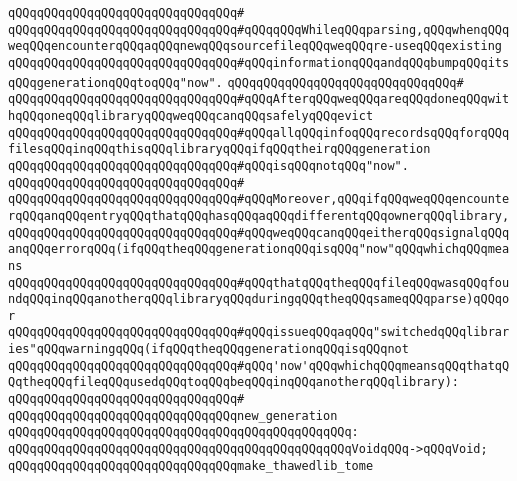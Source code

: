 \verb|qQQqqQQqqQQqqQQqqQQqqQQqqQQqqQQq#|\newline
\verb|qQQqqQQqqQQqqQQqqQQqqQQqqQQqqQQq#qQQqqQQqWhileqQQqparsing,qQQqwhenqQQqweqQQqencounterqQQqaqQQqnewqQQqsourcefileqQQqweqQQqre-useqQQqexisting|\newline
\verb|qQQqqQQqqQQqqQQqqQQqqQQqqQQqqQQq#qQQqinformationqQQqandqQQqbumpqQQqitsqQQqgenerationqQQqtoqQQq"now".|\newline
\verb|qQQqqQQqqQQqqQQqqQQqqQQqqQQqqQQq#|\newline
\verb|qQQqqQQqqQQqqQQqqQQqqQQqqQQqqQQq#qQQqAfterqQQqweqQQqareqQQqdoneqQQqwithqQQqoneqQQqlibraryqQQqweqQQqcanqQQqsafelyqQQqevict|\newline
\verb|qQQqqQQqqQQqqQQqqQQqqQQqqQQqqQQq#qQQqallqQQqinfoqQQqrecordsqQQqforqQQqfilesqQQqinqQQqthisqQQqlibraryqQQqifqQQqtheirqQQqgeneration|\newline
\verb|qQQqqQQqqQQqqQQqqQQqqQQqqQQqqQQq#qQQqisqQQqnotqQQq"now".|\newline
\verb|qQQqqQQqqQQqqQQqqQQqqQQqqQQqqQQq#|\newline
\verb|qQQqqQQqqQQqqQQqqQQqqQQqqQQqqQQq#qQQqMoreover,qQQqifqQQqweqQQqencounterqQQqanqQQqentryqQQqthatqQQqhasqQQqaqQQqdifferentqQQqownerqQQqlibrary,|\newline
\verb|qQQqqQQqqQQqqQQqqQQqqQQqqQQqqQQq#qQQqweqQQqcanqQQqeitherqQQqsignalqQQqanqQQqerrorqQQq(ifqQQqtheqQQqgenerationqQQqisqQQq"now"qQQqwhichqQQqmeans|\newline
\verb|qQQqqQQqqQQqqQQqqQQqqQQqqQQqqQQq#qQQqthatqQQqtheqQQqfileqQQqwasqQQqfoundqQQqinqQQqanotherqQQqlibraryqQQqduringqQQqtheqQQqsameqQQqparse)qQQqor|\newline
\verb|qQQqqQQqqQQqqQQqqQQqqQQqqQQqqQQq#qQQqissueqQQqaqQQq"switchedqQQqlibraries"qQQqwarningqQQq(ifqQQqtheqQQqgenerationqQQqisqQQqnot|\newline
\verb|qQQqqQQqqQQqqQQqqQQqqQQqqQQqqQQq#qQQq'now'qQQqwhichqQQqmeansqQQqthatqQQqtheqQQqfileqQQqusedqQQqtoqQQqbeqQQqinqQQqanotherqQQqlibrary):|\newline
\verb|qQQqqQQqqQQqqQQqqQQqqQQqqQQqqQQq#|\newline
\verb|qQQqqQQqqQQqqQQqqQQqqQQqqQQqqQQqnew_generation|\newline
\verb|qQQqqQQqqQQqqQQqqQQqqQQqqQQqqQQqqQQqqQQqqQQqqQQq:|\newline
\verb|qQQqqQQqqQQqqQQqqQQqqQQqqQQqqQQqqQQqqQQqqQQqqQQqVoidqQQq->qQQqVoid;|\newline
\newline
\verb|qQQqqQQqqQQqqQQqqQQqqQQqqQQqqQQqmake_thawedlib_tome|\newline
